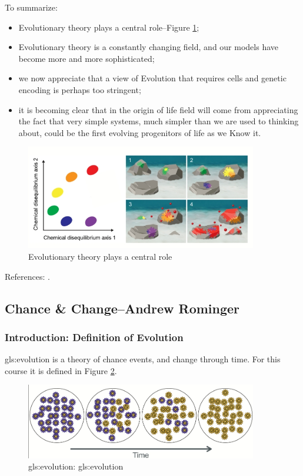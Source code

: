 \documentclass[]{article}
\begin{document}
To summarize:
\begin{itemize}
	\item Evolutionary theory plays a central role--Figure \ref{fig:Baum2018a};
	\item  Evolutionary theory is a constantly changing field, and our models have become more and more sophisticated;
	\item we now appreciate that a view of Evolution that requires cells and genetic encoding is perhaps too stringent;
	\item it is becoming clear that in the origin of life field will come from appreciating the fact that very simple systems, much simpler than we are used to thinking about, could be the first evolving progenitors of life as we Know it.
\end{itemize}


\begin{figure}[H]
	\caption[Evolutionary theory plays a central role]{Evolutionary theory plays a central role\cite{baum2018origin}}\label{fig:Baum2018a}
	\includegraphics[width=0.9\textwidth]{Baum2018a}
\end{figure}

References: \cite{hoyle1983intelligent,wang2015evolution,baum2018origin,baum2015selection}.

\subsection[Chance \& Change]{Chance \& Change--Andrew Rominger}

\subsubsection{Introduction: Definition of Evolution}

\Gls{gls:evolution} is a theory of chance events, and change through time. For this course it is defined in Figure \ref{fig:ChangeThroughTime}.
\begin{figure}[H]
	\caption[Evolution]{\Gls{gls:evolution}: \glsdesc{gls:evolution}}\label{fig:ChangeThroughTime}
	\includegraphics[width=0.9\textwidth]{ChangeThroughTime}
\end{figure}
\end{document}
